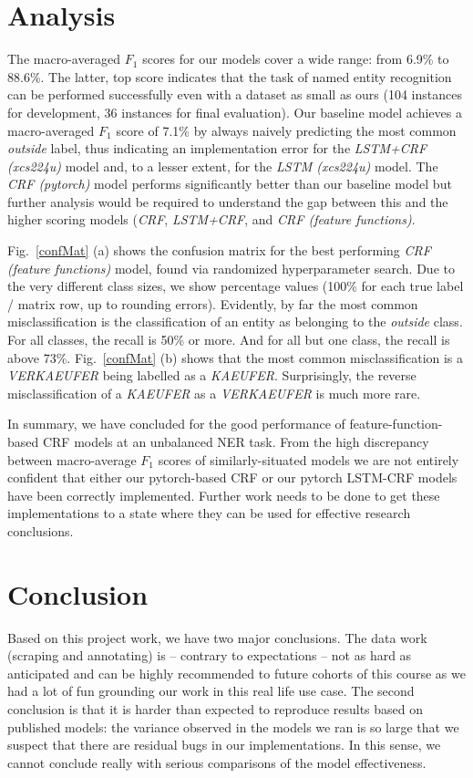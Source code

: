 \documentclass[11pt]{article}
\begin{document}
\section{Analysis}
The macro-averaged $F_1$ scores for our models cover a wide range: from 6.9\% to 88.6\%. The latter, top score indicates that the task of named entity recognition can be performed successfully even with a dataset as small as ours (104 instances for development, 36 instances for final evaluation). Our baseline model achieves a macro-averaged $F_1$ score of 7.1\% by always naively predicting the most common \emph{outside} label, thus indicating an implementation error for the \emph{LSTM+CRF (xcs224u)} model and, to a lesser extent, for the \emph{LSTM (xcs224u)} model. The \emph{CRF (pytorch)} model performs significantly better than our baseline model but further analysis would be required to understand the gap between this and the higher scoring models (\emph{CRF}, \emph{LSTM+CRF}, and \emph{CRF (feature functions)}.

Fig.~\ref{confMat} (a) shows the confusion matrix for the best performing \emph{CRF (feature functions)} model, found via randomized hyperparameter search. Due to the very different class sizes, we show percentage values (100\% for each true label / matrix row, up to rounding errors). Evidently, by far the most common misclassification is the classification of an entity as belonging to the \emph{outside} class. For all classes, the recall is 50\% or more. And for all but one class, the recall is above 73\%. Fig.~\ref{confMat} (b) shows that the most common misclassification is a \emph{VERKAEUFER} being labelled as a \emph{KAEUFER}. Surprisingly, the reverse misclassification of a \emph{KAEUFER} as a \emph{VERKAEUFER} is much more rare.

In summary, we have concluded for the good performance of feature-function-based CRF models at an unbalanced NER task. From the high discrepancy between macro-average $F_1$ scores of similarly-situated models we are not entirely confident that either our pytorch-based CRF or our pytorch LSTM-CRF models have been correctly implemented. Further work needs to be done to get these implementations to a state where they can be used for effective research conclusions.

\section{Conclusion}

Based on this project work, we have two major conclusions. The data work (scraping and annotating) is -- contrary to expectations -- not as hard as anticipated and can be highly recommended to future cohorts of this course as we had a lot of fun grounding our work in this real life use case. The second conclusion is that it is harder than expected to reproduce results based on published models: the variance observed in the models we ran is so large that we suspect that there are residual bugs in our implementations. In this sense, we cannot conclude really with serious comparisons of the model effectiveness. 
\end{document}
